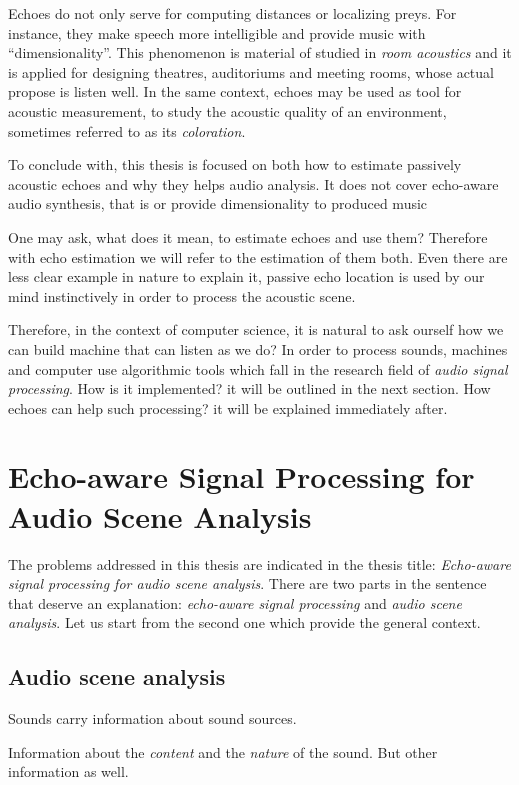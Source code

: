 \mynewline
Echoes do not only serve for computing distances or localizing preys.
For instance, they make speech more intelligible and provide music with ``dimensionality''.
This phenomenon is material of studied in \textit{room acoustics} and it is applied for designing theatres, auditoriums and meeting rooms, whose actual propose is listen well.
In the same context, echoes may be used as tool for acoustic measurement, to study the acoustic quality of an environment, sometimes referred to as its \textit{coloration}.

\mynewline
To conclude with, this thesis is focused on both how to estimate passively acoustic echoes and why they helps audio analysis.
It does not cover echo-aware audio synthesis, that is or provide dimensionality to produced music

\mynewline
One may ask, what does it mean, to estimate echoes and use them?
Therefore with echo estimation we will refer to the estimation of them both.
Even there are less clear example in nature to explain it, passive echo location is used by our mind instinctively in order to process the acoustic scene.

\mynewline
Therefore, in the context of computer science, it is natural to ask ourself how we can build machine that can listen as we do?
In order to process sounds, machines and computer use algorithmic tools which fall in the research field of \textit{audio signal processing}.
How is it implemented? it will be outlined in the next section.
How echoes can help such processing? it will be explained immediately after.

\section{Echo-aware Signal Processing for Audio Scene Analysis}\label{sec:intro:problem}
The problems addressed in this thesis are indicated in the thesis title: \textit{Echo-aware signal processing for audio scene analysis}.
There are two parts in the sentence that deserve an explanation: \textit{echo-aware signal processing} and \textit{audio scene analysis}.
Let us start from the second one which provide the general context.

\subsection{Audio scene analysis}
Sounds carry information about sound sources.

Information about the \textit{content} and the \textit{nature} of the sound.
But other information as well.

